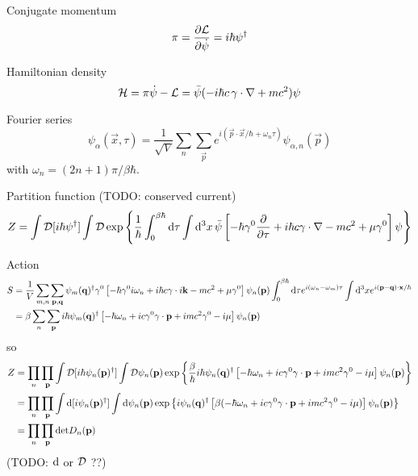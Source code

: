 Conjugate momentum
\begin{equation}
	\pi = \pdv{\mathcal{L}}{\dot{\psi}} = i \hbar \psi^\dagger
\end{equation}

Hamiltonian density
\begin{equation}
	\mathcal{H} = \pi \dot\psi - \mathcal{L} = \bar\psi ( -i \hbar c \, \mathbf{\gamma} \cdot \mathbf{\nabla} + m c^2 ) \psi
\end{equation}

Fourier series
\begin{equation}
	\psi_\alpha(\vec{x}, \tau) = \frac{1}{\sqrt{V}} \sum_n \sum_\vec{p} e^{i (\vec{p} \cdot \vec{x} / \hbar + \omega_n \tau)} \psi_{\alpha, n}(\vec{p})
\end{equation}
with $\omega_n = (2n+1) \pi / \beta \hbar$.

Partition function
(TODO: conserved current)
\begin{equation}
	Z = \int \mathcal{D} [i \hbar \psi^\dagger] \int \mathcal{D} 
	    \exp \left\{ \frac{1}{\hbar} \int_0^{\beta \hbar} \mathop{}\!\mathrm{d} \tau \int \mathop{}\!\mathrm{d}^3 x \, \bar\psi \left[ -\hbar \gamma^0 \pdv{}{\tau} + i \hbar c \mathbf{\gamma} \cdot \mathbf{\nabla} - mc^2 + \mu \gamma^0 \right] \psi \right\}
\end{equation}

Action
\begin{equation}
\begin{split}
	S & = \frac{1}{V} \sum_{m,n} \sum_{\mathbf{p},\mathbf{q}}         \psi_m(\mathbf{q})^\dagger \gamma^0 \left[ -\hbar \gamma^0 i \omega_n + i \hbar c \mathbf{\gamma} \cdot i \mathbf{k} - m c^2 + \mu \gamma^0 \right] \psi_n(\mathbf{p}) \int_0^{\beta \hbar} \mathop{}\!\mathrm{d} \tau e^{i(\omega_n-\omega_m)\tau} \int \mathop{}\!\mathrm{d}^3 x e^{i(\mathbf{p}-\mathbf{q})\cdot\mathbf{x}/\hbar} \\
	  & = \beta       \sum_{n}   \sum_{\mathbf{p}}         i \hbar \psi_m(\mathbf{q})^\dagger          \left[ -\hbar \omega_n + i c \gamma^0 \mathbf{\gamma} \cdot \mathbf{p} + i m c^2 \gamma^0 - i \mu \right] \psi_n(\mathbf{p}) \\
\end{split}
\end{equation}
so
\begin{equation}
\begin{split}
	Z & = \prod_n \prod_{\mathbf{p}} \int \mathcal{D} [i \hbar \psi_n(\mathbf{p})^\dagger] \int \mathcal{D} \psi_n(\mathbf{p})
	      \exp \left\{ \frac{\beta}{\hbar} i \hbar \psi_n(\mathbf{q})^\dagger \left[ -\hbar \omega_n + i c \gamma^0 \mathbf{\gamma} \cdot \mathbf{p} + i mc^2 \gamma^0 - i \mu \right] \psi_n(\mathbf{p}) \right\} \\
	  & = \prod_n \prod_{\mathbf{p}} \int \mathop{}\!\mathrm{d} [i \psi_n(\mathbf{p})^\dagger] \int \mathop{}\!\mathrm{d} \psi_n(\mathbf{p})
	      \exp \left\{ i \psi_n(\mathbf{q})^\dagger \left[ \beta( -\hbar \omega_n + i c \gamma^0 \mathbf{\gamma} \cdot \mathbf{p} + i mc^2 \gamma^0 - i \mu ) \right] \psi_n(\mathbf{p}) \right\} \\
	  & = \prod_n \prod_{\mathbf{p}} \text{det} D_n(\mathbf{p})
\end{split}
\end{equation}
(TODO: $\mathop{}\!\mathrm{d}$ or $\mathcal{D}$ ??)

